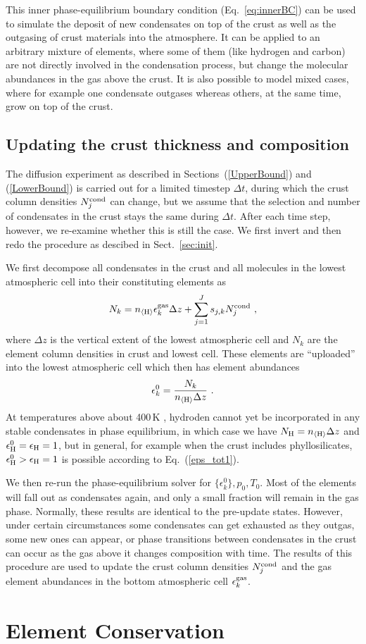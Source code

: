 \documentclass[11pt]{article}
\def\nH{n_{\langle\rm H\rangle}}
\def\ek{\epsilon_k}
\begin{document}
This inner phase-equilibrium boundary condition (Eq.~\ref{eq:innerBC})
can be used to simulate the deposit of new condensates on top of the
crust as well as the outgasing of crust materials into the
atmosphere. It can be applied to an arbitrary mixture of elements,
where some of them (like hydrogen and carbon) are not directly
involved in the condensation process, but change the molecular
abundances in the gas above the crust. It is also possible to model
mixed cases, where for example one condensate outgases whereas others,
at the same time, grow on top of the crust.


\subsection{Updating the crust thickness and composition}

The diffusion experiment as described in Sections~(\ref{UpperBound})
and (\ref{LowerBound}) is carried out for a limited timestep $\Delta
t$, during which the crust column densities $N_j^{\rm cond}$ can
change, but we assume that the selection and number of 
condensates in the crust stays the same during $\Delta t$.  After
each time step, however, we re-examine whether this is still the case.
We first invert and then redo the procedure as descibed in
Sect.~\ref{sec:init}.
 
We first decompose all condensates in the crust and all molecules in
the lowest atmospheric cell into their constituting elements as
\begin{equation}
  N_k = \nH\ek^{\rm gas}\Delta z + \sum_{j=1}^J s_{j,k}N_j^{\rm cond} \ ,
\end{equation}
where $\Delta z$ is the vertical extent of the lowest atmospheric cell and 
$N_k$ are the element column densities in crust and lowest cell. These
elements are ``uploaded'' into the lowest atmospheric cell which 
then has element abundances
\begin{equation}
  \ek^0 = \frac{N_k}{\nH\Delta z} \ .
  \label{eps_tot1}
\end{equation}
At temperatures above about 400\,K \citep{Woitke2017}, hydroden cannot
yet be incorporated in any stable condensates in phase
equilibrium, in which case we have $N_{\rm H} = \nH\Delta z$ and
$\epsilon_{\rm H}^0 = \epsilon_{\rm H} = 1$, but in general, for
example when the crust includes phyllosilicates, $\epsilon_{\rm H}^0 >
\epsilon_{\rm H} = 1$ is possible according to Eq.~(\ref{eps_tot1}).

We then re-run the phase-equilibrium solver for $\{\ek^0\},p_0,T_0$.
Most of the elements will fall out as condensates again, and only a
small fraction will remain in the gas phase.  Normally, these results
are identical to the pre-update states.  However, under certain
circumstances some condensates can get exhausted as they outgas, some
new ones can appear, or phase transitions between condensates in the
crust can occur as the gas above it changes composition with time. The
results of this procedure are used to update the crust column
densities $N_j^{\rm cond}$ and the gas element abundances in the
bottom atmospheric cell $\ek^{\rm gas}$.

\section{Element Conservation}





\end{document}
